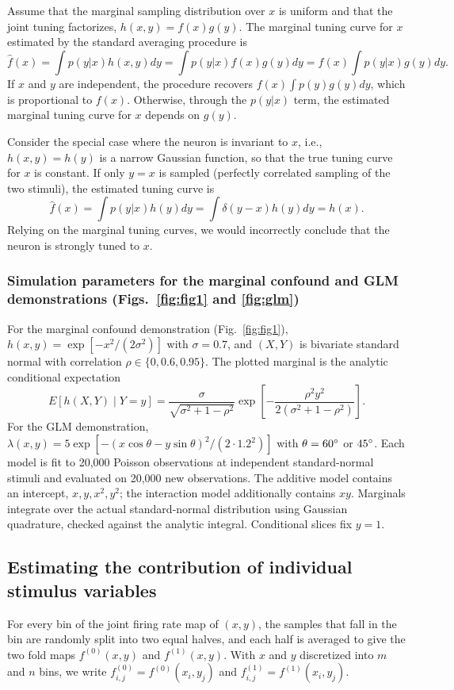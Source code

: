 \documentclass[11pt]{article}
\begin{document}
Assume that the marginal sampling distribution over $x$ is uniform and that the joint tuning factorizes, $h(x,y)=f(x)g(y)$. The marginal tuning curve for $x$ estimated by the standard averaging procedure is
$$
\hat{f}(x) = \int p(y|x)h(x,y)dy = \int p(y|x)f(x) g(y)dy =f(x)\int p(y|x)g(y)dy .
$$
If $x$ and $y$ are independent, the procedure recovers $f(x)\int p(y)g(y)dy$, which is proportional to $f(x)$. Otherwise, through the $p(y|x)$ term, the estimated marginal tuning curve for $x$ depends on $g(y)$.

Consider the special case where the neuron is invariant to $x$, i.e., $h(x,y)=h(y)$ is a narrow Gaussian function, so that the true tuning curve for $x$ is constant. If only $y=x$ is sampled (perfectly correlated sampling of the two stimuli), the estimated tuning curve is
$$
\hat{f}(x) = \int p(y|x)h(y)dy = \int \delta(y-x)h(y)dy=h(x).
$$
Relying on the marginal tuning curves, we would incorrectly conclude that the neuron is strongly tuned to $x$.

\subsubsection*{Simulation parameters for the marginal confound and GLM demonstrations (Figs.~\ref{fig:fig1} and \ref{fig:glm})}

For the marginal confound demonstration (Fig.~\ref{fig:fig1}), $h(x,y)=\exp[-x^2/(2\sigma^2)]$ with $\sigma=0.7$, and $(X,Y)$ is bivariate standard normal with correlation $\rho\in\{0,0.6,0.95\}$. The plotted marginal is the analytic conditional expectation
\[
E[h(X,Y)\mid Y=y]=\frac{\sigma}{\sqrt{\sigma^2+1-\rho^2}}\exp\left[-\frac{\rho^2y^2}{2(\sigma^2+1-\rho^2)}\right].
\]
For the GLM demonstration, $\lambda(x,y)=5\exp[-(x\cos\theta-y\sin\theta)^2/(2\cdot1.2^2)]$ with $\theta=60\degree$ or $45\degree$. Each model is fit to 20,000 Poisson observations at independent standard-normal stimuli and evaluated on 20,000 new observations. The additive model contains an intercept, $x,y,x^2,y^2$; the interaction model additionally contains $xy$. Marginals integrate over the actual standard-normal distribution using Gaussian quadrature, checked against the analytic integral. Conditional slices fix $y=1$.

\subsection{Estimating the contribution of individual stimulus variables}
For every bin of the joint firing rate map of $(x, y)$, the samples that fall in the bin are randomly split into two equal halves, and each half is averaged to give the two fold maps $f^{(0)}(x,y)$ and $f^{(1)}(x,y)$. With $x$ and $y$ discretized into $m$ and $n$ bins, we write $f^{(0)}_{i,j} = f^{(0)}(x_i, y_j)$ and $f^{(1)}_{i,j} = f^{(1)}(x_i, y_j)$.
\end{document}
